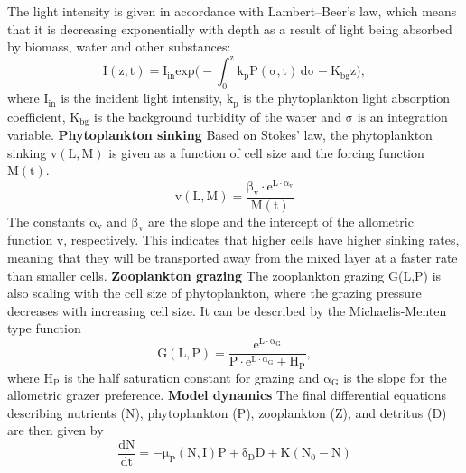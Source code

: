 The light intensity is given in accordance with Lambert–Beer’s law, which means that it is decreasing exponentially with depth as a result of light being absorbed by biomass, water and other substances:
\begin{equation}
    \label{eq:light}
    \mathrm{I(z,t) = I_{in}exp \bigg( - \int_{0}^{z} k_{p}P(\sigma,t) \,d \sigma - K_{bg}z \bigg)},
\end{equation}
where $\mathrm{I_{in}}$ is the incident light intensity, $\mathrm{k_p}$ is the phytoplankton light absorption coefficient, $\mathrm{K_{bg}}$ is the background turbidity of the water and $\mathrm{\sigma}$ is an integration variable. 
\newline
\newline
\textbf{Phytoplankton sinking}
\newline
Based on Stokes' law, the phytoplankton sinking $\mathrm{v(L,M)}$ is given as a function of cell size and the forcing function $\mathrm{M(t)}$.
\begin{equation}
    \label{eq:sinking}
    \mathrm{v(L,M) = \frac{\beta_v\cdot e^{L\cdot \alpha_v}}{M(t)}}
\end{equation}
The constants $\mathrm{\alpha_v}$ and $\mathrm{\beta_v}$ are the slope and the intercept of the allometric function v, respectively. This indicates that higher cells have higher sinking rates, meaning that they will be transported away from the mixed layer at a faster rate than smaller cells. 
\newline
\newline
\textbf{Zooplankton grazing}
\newline
The zooplankton grazing G(L,P) is also scaling with the cell size of phytoplankton, where the grazing pressure decreases with increasing cell size. It can be described by the Michaelis-Menten type function
\begin{equation}
    \label{eq:grazing}
    \mathrm{G(L,P) = \frac{e^{L\cdot\alpha_G}}{P\cdot e^{L\cdot \alpha_G}+H_P}},
\end{equation}
where $\mathrm{H_P}$ is the half saturation constant for grazing and $\mathrm{\alpha_G}$ is the slope for the allometric grazer preference.
\newline
\newline
\textbf{Model dynamics}
\newline
The final differential equations describing nutrients (N), phytoplankton (P), zooplankton (Z), and detritus (D) are then given by
\begin{equation}
    \label{eq:Ndynamics}
    \mathrm{\frac{dN}{dt} = -\mu_P(N,I)P+\delta_D D+K(N_0-N)}
\end{equation}
